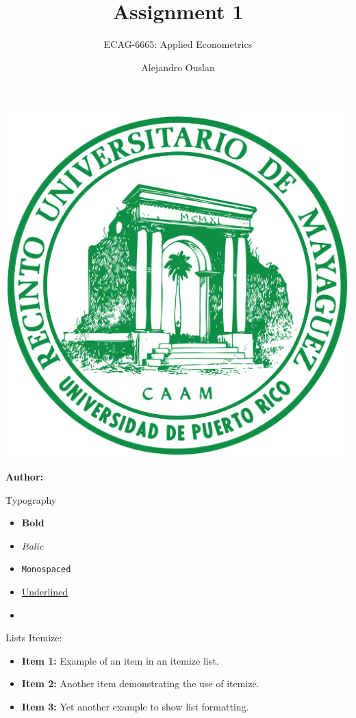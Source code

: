 \documentclass[12pt]{beamer}
\title[]{Assignment 1}
\subtitle{ECAG-6665: Applied Econometrics}
\author[Name Surname]{Alejandro Ouslan}
\institute[UPR.png]{University of Puerto Rico}
\date{} %
\begin{document}
\begin{frame}{}
	\vspace{\fill}

	\includegraphics[width=0.16\linewidth]{../../assets/uprm_logo.png}

	\vspace{\fill}

	\Large
	\color{main}
	\inserttitle

	\medskip

	\large
	\color{black}
	\insertsubtitle

	\vspace{\fill}

	\footnotesize
	\insertinstitute

	\vspace{\fill}

	\textbf{Author:} \insertauthor

	\medskip

	\insertdate

	\vspace{\fill}
\end{frame}

\begin{frame}[allowframebreaks]{Typography}
	\begin{itemize}
		\item \textbf{Bold}
		\item \textit{Italic}
		\item \texttt{Monospaced}
		\item \underline{Underlined}
		\item \href{https://example.com/}{\underline{\color{main}{Link}}}
	\end{itemize}
\end{frame}

\begin{frame}[allowframebreaks]{Lists}
	Itemize:

	\begin{itemize}
		\item \textbf{Item 1:} Example of an item in an itemize list.
		\item \textbf{Item 2:} Another item demonstrating the use of itemize.
		\item \textbf{Item 3:} Yet another example to show list formatting.
	\end{itemize}
\end{frame}
\end{document}
